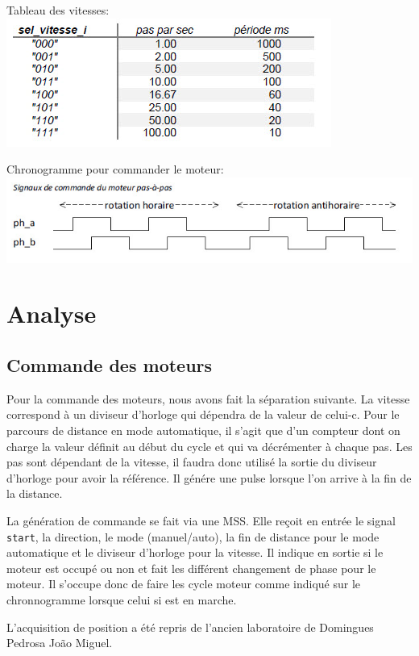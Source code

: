 \documentclass[10pt,a4paper]{article}
\begin{document}
Tableau des vitesses:\\
\includegraphics[scale=0.5]{images/vitesse.jpg}

Chronogramme pour commander le moteur:\\
\includegraphics[scale=0.5]{images/cmd_moteur.jpg}
\newpage
\section{Analyse}
\subsection{Commande des moteurs}
Pour la commande des moteurs, nous avons fait la séparation suivante. La vitesse correspond à un diviseur d'horloge qui dépendra de la valeur de celui-c. Pour le parcours de distance en mode automatique, il s'agit que d'un compteur dont on charge la valeur définit au début du cycle et qui va décrémenter à chaque pas. Les pas sont dépendant de la vitesse, il faudra donc utilisé la sortie du diviseur d'horloge pour avoir la référence. Il génére une pulse lorsque l'on arrive à la fin de la distance.

La génération de commande se fait via une MSS. Elle reçoit en entrée le signal \texttt{start}, la direction, le mode (manuel/auto), la fin de distance pour le mode automatique et le diviseur d'horloge pour la vitesse. Il indique en  sortie si le moteur est occupé ou non et fait les différent changement de phase pour le moteur. Il s'occupe donc de faire les cycle moteur comme indiqué sur le chronnogramme lorsque celui si est en marche.

L'acquisition de position a été repris de l'ancien laboratoire de Domingues Pedrosa João Miguel.
\end{document}
